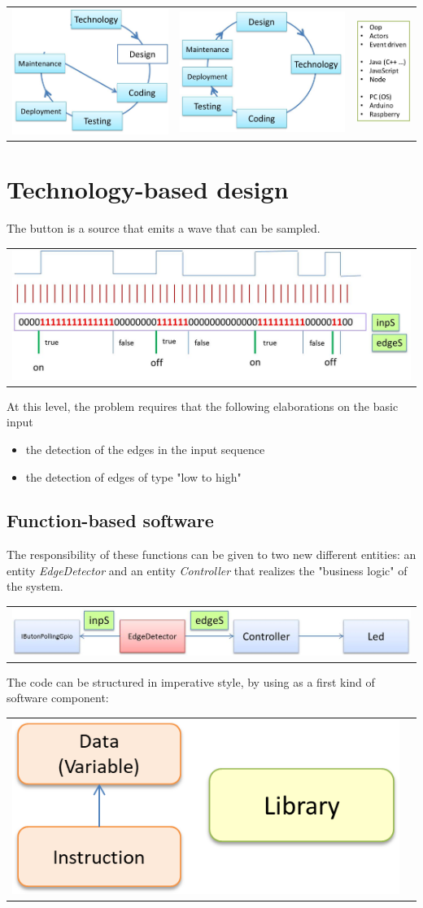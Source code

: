 \documentclass[10pt,a4paper,openright,twoside]{../llncs}
\newcommand{\code}[1]{{\color{blue}{\texttt{#1}}}}
\begin{document}
\begin{tabular}{ | c | c | c | }
     \includegraphics[scale = 0.35]{img/introDesign1.jpg} & \includegraphics[scale = 0.35]{img/introDesign2.jpg} & \includegraphics[scale = 0.35]{img/introDesignTecno.jpg}
\end{tabular}


\newpage 
\section{Technology-based design}

The button is a source that emits a wave that can be sampled. 
\medskip 

\begin{tabular}{ c }
     \includegraphics[scale = 0.45]{img/buttonLedWave.jpg}
\end{tabular}

 

At this level, the problem requires that the following elaborations on the basic input 
\begin{itemize}
\item the detection of the edges in the input sequence
\item the detection of edges of type "low to high"  
\end{itemize}

\subsection{Function-based software}
The responsibility of these functions can be given to two new different entities: an entity \textit{EdgeDetector} and an entity \textit{Controller} that realizes the "business logic" of the system. 

\begin{tabular}{ c }
     \includegraphics[scale = 0.55]{img/buttonLedLogic0.jpg}
\end{tabular}


The code can be structured in imperative style, by using \code{functions} as a first kind of software component:

\begin{tabular}{|c|c|}
\hline 
\includegraphics[scale = 0.4]{img/c0.png} &  \includegraphics
\end{tabular}
\end{document}
